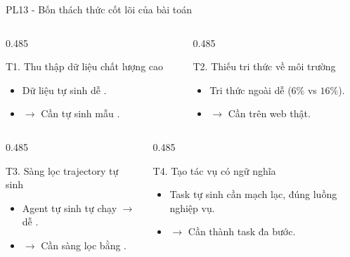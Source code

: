 \begin{frame}{PL13 - Bốn thách thức cốt lõi của bài toán}
  \begin{columns}[onlytextwidth,t]
    \begin{column}{0.485\textwidth}
        \begin{hblock}{T1. Thu thập dữ liệu chất lượng cao}{\bhCp}
          \begin{itemize}\ilist
            \item Dữ liệu tự sinh dễ .
            \item $\rightarrow$ Cần tự sinh mẫu .
          \end{itemize}
        \end{hblock}
    \end{column}

    \hfill
    \begin{column}{0.485\textwidth}
        \begin{hblock}{T2. Thiếu tri thức về môi trường}{\bhCp}
          \begin{itemize}\ilist
            \item Tri thức ngoài dễ  ($6\%$ vs $16\%$).
            \item $\rightarrow$ Cần  trên web thật.
          \end{itemize}
        \end{hblock}
    \end{column}
  \end{columns}

  \gap
  \begin{columns}[onlytextwidth,t]
    \begin{column}{0.485\textwidth}
        \begin{hblock}{T3. Sàng lọc trajectory tự sinh}{\bhCp}
          \begin{itemize}\ilist
            \item Agent tự sinh tự chạy $\rightarrow$ dễ .
            \item $\rightarrow$ Cần sàng lọc bằng .
          \end{itemize}
        \end{hblock}
    \end{column}

    \hfill
    \begin{column}{0.485\textwidth}
        \begin{hblock}{T4. Tạo tác vụ có ngữ nghĩa}{\bhCp}
          \begin{itemize}\ilist
            \item Task tự sinh cần mạch lạc, đúng luồng nghiệp vụ.
            \item $\rightarrow$ Cần  thành task đa bước.
          \end{itemize}
        \end{hblock}
    \end{column}
  \end{columns}
\end{frame}
